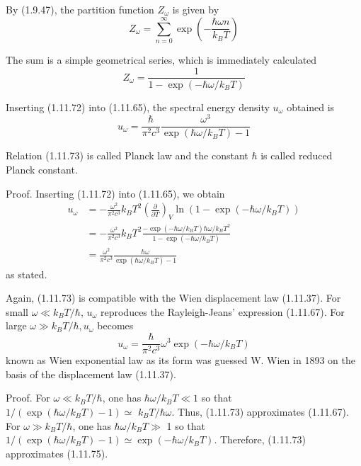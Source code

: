 \documentclass{article}
\begin{document}
By (1.9.47), the partition function $Z_{\omega}$ is given by
$$
\begin{equation*}
Z_{\omega}=\sum_{n=0}^{\infty} \exp \left(-\frac{\hbar \omega n}{k_{B} T}\right) \tag{1.11.71}
\end{equation*}
$$

The sum is a simple geometrical series, which is immediately calculated
$$
\begin{equation*}
Z_{\omega}=\frac{1}{1-\exp \left(-\hbar \omega / k_{B} T\right)} \tag{1.11.72}
\end{equation*}
$$

Inserting (1.11.72) into (1.11.65), the spectral energy density $u_{\omega}$ obtained is
$$
\begin{equation*}
u_{\omega}=\frac{\hbar}{\pi^{2} c^{3}} \frac{\omega^{3}}{\exp \left(\hbar \omega / k_{B} T\right)-1} \tag{1.11.73}
\end{equation*}
$$

Relation (1.11.73) is called Planck law and the constant $\hbar$ is called reduced Planck constant.

Proof. Inserting (1.11.72) into (1.11.65), we obtain
$$
\begin{align*}
u_{\omega} & =-\frac{\omega^{2}}{\pi^{2} c^{3}} k_{B} T^{2}\left(\frac{\partial}{\partial T}\right)_{V} \ln \left(1-\exp \left(-\hbar \omega / k_{B} T\right)\right)  \tag{1.11.74}\\
& =-\frac{\omega^{2}}{\pi^{2} c^{3}} k_{B} T^{2} \frac{-\exp \left(-\hbar \omega / k_{B} T\right) \hbar \omega / k_{B} T^{2}}{1-\exp \left(-\hbar \omega / k_{B} T\right)} \\
& =\frac{\omega^{2}}{\pi^{2} c^{3}} \frac{\hbar \omega}{\exp \left(\hbar \omega / k_{B} T\right)-1}
\end{align*}
$$
as stated.

Again, (1.11.73) is compatible with the Wien displacement law (1.11.37). For small $\omega \ll k_{B} T / \hbar$, $u_{\omega}$ reproduces the Rayleigh-Jeans' expression (1.11.67). For large $\omega \gg k_{B} T / \hbar, u_{\omega}$ becomes
$$
\begin{equation*}
u_{\omega}=\frac{\hbar}{\pi^{2} c^{3}} \omega^{3} \exp \left(-\hbar \omega / k_{B} T\right) \tag{1.11.75}
\end{equation*}
$$
known as Wien exponential law as its form was guessed W. Wien in 1893 on the basis of the displacement law (1.11.37).

Proof. For $\omega \ll k_{B} T / \hbar$, one has $\hbar \omega / k_{B} T \ll 1$ so that $1 /\left(\exp \left(\hbar \omega / k_{B} T\right)-1\right) \simeq$ $k_{B} T / \hbar \omega$. Thus, (1.11.73) approximates (1.11.67). For $\omega \gg k_{B} T / \hbar$, one has $\hbar \omega / k_{B} T \gg$ 1 so that $1 /\left(\exp \left(\hbar \omega / k_{B} T\right)-1\right) \simeq \exp \left(-\hbar \omega / k_{B} T\right)$. Therefore, (1.11.73) approximates (1.11.75).
\end{document}
